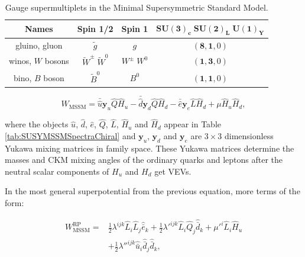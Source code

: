 \begin{table}[!ht]
\begin{center}
\begin{small}
\setlength{\tabcolsep}{0.0pc}
\begin{tabular*}{\textwidth}{@{\extracolsep{\fill}}cccc}
\hline
\textbf{Names}    & \textbf{Spin 1/2} & \textbf{Spin 1} & $\mathbf{SU(3)_{c}\; SU(2)_{L}\; U(1)_{Y}}$ \\
\hline
gluino, gluon     & $\tilde{g}$ & $g$ & $(\mathbf{8}, \mathbf{1}, 0)$ \\
winos, $W$ bosons & $\tilde{W}^\pm \;\tilde{W}^0$ & $W^\pm\; W^0$ & $(\mathbf{1}, \mathbf{3}, 0)$ \\
bino, $B$ boson   & $\tilde{B}^0$ & $B^0$ & $(\mathbf{1}, \mathbf{1}, 0)$ \\
\hline
\end{tabular*}
\end{small}
\end{center}
\caption{Gauge supermultiplets in the Minimal Supersymmetric Standard Model.}
\label{tab:SUSYMSSMSpectraGauge}
\end{table}


\begin{equation}
W_\text{MSSM} = \bar{\hat{u}}\mathbf{y}_u \hat{Q} \hat{H}_u - \bar{\hat{d}}\mathbf{y}_d \hat{Q} \hat{H}_d - \bar{\hat{e}}\mathbf{y}_e \hat{L} \hat{H}_d + \mu\hat{H}_u \hat{H}_d,
\label{eq:SUSYMSSMSuperPotential}
\end{equation}

\noindent where the objects $\hat{u}$, $\hat{d}$, $\hat{e}$, $\hat{Q}$, $\hat{L}$, $\hat{H}_u$ and $\hat{H}_d$ appear in Table \ref{tab:SUSYMSSMSpectraChiral} and $\mathbf{y}_u$, $\mathbf{y}_d$ and $\mathbf{y}_e$ are $3\times3$ dimensionless Yukawa mixing matrices in family space.
These Yukawa matrices determine the masses and CKM mixing angles of the ordinary quarks and leptons after the neutral scalar components of $H_u$ and $H_d$ get VEVs.

In the most general superpotential from the previous equation, more terms of the form:

\begin{equation}
\begin{split}
W_\text{MSSM}^\text{RP} = & \frac{1}{2}\lambda^{ijk} \hat{L}_i \hat{L}_j \hat{\bar{e}}_k + \frac{1}{2}\lambda'^{ijk} \hat{L}_i \hat{Q}_j \hat{\bar{d}}_k + \mu'^{i} \hat{L}_i \hat{H}_u \\
& + \frac{1}{2}\lambda''^{ijk} \hat{\bar{u}}_i \hat{\bar{d}}_j \hat{\bar{d}}_k,
\end{split}
\label{eq:SUSYMSSMRparityViolatingSuperpotential}
\end{equation}

